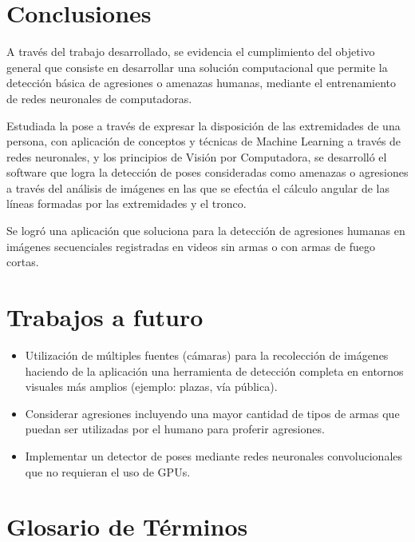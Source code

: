 \documentclass[a4paper,12pt,oneside,spanish]{book}
\begin{document}
\newpage
\chapter{Conclusiones}
A través del trabajo desarrollado, se evidencia el cumplimiento del objetivo general que consiste en desarrollar una solución computacional que permite la detección básica de agresiones o amenazas humanas, mediante el entrenamiento de redes neuronales de computadoras.\par

Estudiada la pose a través de expresar la disposición de las extremidades de una persona, con aplicación de conceptos y técnicas de Machine Learning a través de redes neuronales, y los principios de Visión por Computadora, se desarrolló el software que logra la detección de poses consideradas como amenazas o agresiones a través del análisis de imágenes en las que se efectúa el cálculo angular de las líneas formadas por las extremidades y el tronco.\par

Se logró una aplicación que soluciona para la detección de agresiones humanas en imágenes secuenciales registradas en videos sin armas o con armas de fuego cortas.\par

\chapter{Trabajos a futuro}
\begin{itemize}
	\item Utilización de múltiples fuentes (cámaras) para la recolección de imágenes haciendo de la aplicación una herramienta de detección completa en entornos visuales más amplios (ejemplo: plazas, vía pública).\par

	\item Considerar agresiones incluyendo una mayor cantidad de tipos de armas que puedan ser utilizadas por el humano para proferir agresiones.\par

\item Implementar un detector de poses mediante redes neuronales convolucionales que no requieran el uso de GPUs.\par
\end{itemize}

\newpage
\chapter{Glosario de Términos}
\setlength{\parskip}{-1.0em}
\setlength{\parindent}{0em}
 
\end{document}
